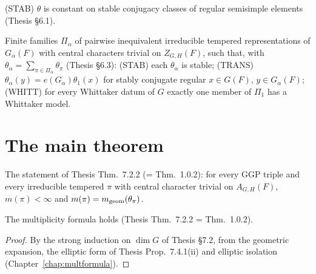 \begin{definition}
\label{IsStableFn}
\leanok
{}
(STAB) $\theta$ is constant on stable conjugacy classes of regular semisimple elements (Thesis \S6.1).
\end{definition}

\begin{definition}
\label{TemperedPacketFamily}
\leanok
{}
Finite families $\Pi_\alpha$ of pairwise inequivalent irreducible tempered representations of $G_\alpha(F)$
with central characters trivial on $Z_{G,H}(F)$, such that, with $\theta_\alpha=\sum_{\pi\in\Pi_\alpha}\theta_\pi$
(Thesis \S6.3):
(STAB) each $\theta_\alpha$ is stable;
(TRANS) $\theta_\alpha(y)=e(G_\alpha)\theta_1(x)$ for stably conjugate regular $x\in G(F)$, $y\in G_\alpha(F)$;
(WHITT) for every Whittaker datum of $G$ exactly one member of $\Pi_1$ has a Whittaker model.
\end{definition}

\section{The main theorem}
\begin{definition}
\label{MultiplicityFormula}
\leanok
{}
The statement of Thesis Thm.~7.2.2 (= Thm.~1.0.2): for every GGP triple and every irreducible tempered
$\pi$ with central character trivial on $A_{G,H}(F)$, $m(\pi)<\infty$ and $m(\pi)=m_{\mathrm{geom}}(\theta_\pi)$.
\end{definition}

\begin{theorem}
\label{multiplicity_formula}
\leanok
{}
The multiplicity formula holds (Thesis Thm.~7.2.2 = Thm.~1.0.2).
\end{theorem}
\begin{proof}
\leanok
{}
By the strong induction on $\dim G$ of Thesis \S7.2, from the geometric expansion, the elliptic form of
Thesis Prop.~7.4.1(ii) and elliptic isolation (Chapter~\ref{chap:multformula}).
\end{proof}

